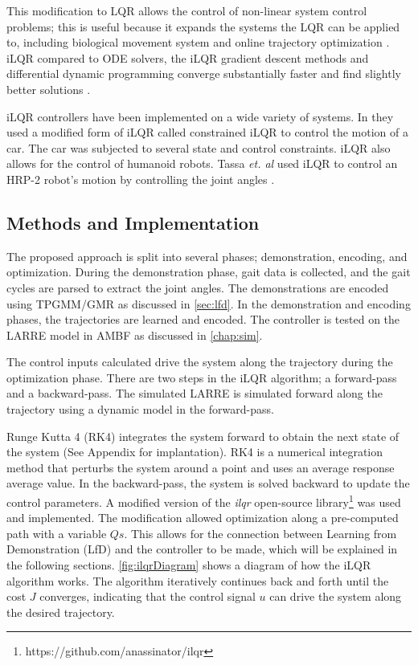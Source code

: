 This modification to LQR allows the control of non-linear system control problems; this is useful because it expands the systems the LQR can be applied to, including biological movement system \cite{iLQR_Li2004} and online trajectory optimization \cite{iLQR_tassa2012}. iLQR compared to ODE solvers, the iLQR gradient descent methods and differential dynamic programming converge substantially faster and find slightly better solutions \cite{iLQR_Li2004}. 

iLQR controllers have been implemented on a wide variety of systems. In \cite{car} they used a modified form of iLQR called constrained iLQR to control the motion of a car. The car was subjected to several state and control constraints. iLQR also allows for the control of humanoid robots. Tassa \textit{et. al} used iLQR to control an HRP-2 robot's motion by controlling the joint angles \cite{iLQR_tassa2014}.

\subsection{Methods and Implementation}
 The proposed approach is split into several phases; demonstration, encoding, and optimization. During the demonstration phase, gait data is collected, and the gait cycles are parsed to extract the joint angles. The demonstrations are encoded using TPGMM/GMR as discussed in \autoref{sec:lfd}. In the demonstration and encoding phases, the trajectories are learned and encoded. The controller is tested on the LARRE model in AMBF as discussed in \autoref{chap:sim}. 

The control inputs calculated drive the system along the trajectory during the optimization phase. There are two steps in the iLQR algorithm; a forward-pass and a backward-pass. The simulated LARRE is simulated forward along the trajectory using a dynamic model in the forward-pass. 

Runge Kutta 4 (RK4) integrates the system forward to obtain the next state of the system \cite{dit2017runge} (See Appendix for implantation). RK4 is a numerical integration method that perturbs the system around a point and uses an average response average value. In the backward-pass, the system is solved backward to update the control parameters. A modified version of the \textit{ilqr} open-source library\footnote{https://github.com/anassinator/ilqr} was used and implemented. The modification allowed optimization along a pre-computed path with a variable $Qs$. This allows for the connection between Learning from Demonstration (LfD) and the controller to be made, which will be explained in the following sections.  \autoref{fig:ilqrDiagram} shows a diagram of how the iLQR algorithm works. The algorithm iteratively continues back and forth until the cost $J$ converges, indicating that the control signal $u$ can drive the system along the desired trajectory. 

